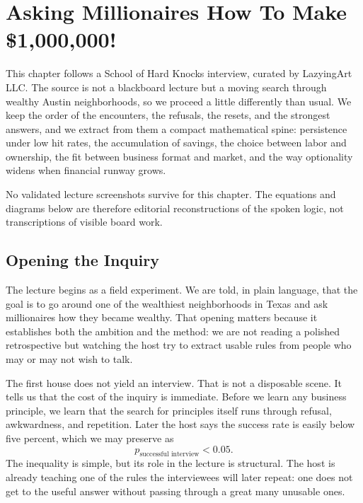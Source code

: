 \chapter{Asking Millionaires How To Make \$1{,}000{,}000!}

This chapter follows a School of Hard Knocks interview, curated by LazyingArt LLC. The source is not a blackboard lecture but a moving search through wealthy Austin neighborhoods, so we proceed a little differently than usual. We keep the order of the encounters, the refusals, the resets, and the strongest answers, and we extract from them a compact mathematical spine: persistence under low hit rates, the accumulation of savings, the choice between labor and ownership, the fit between business format and market, and the way optionality widens when financial runway grows.

\begin{remark}
No validated lecture screenshots survive for this chapter. The equations and diagrams below are therefore editorial reconstructions of the spoken logic, not transcriptions of visible board work.
\end{remark}

\section{Opening the Inquiry}

The lecture begins as a field experiment. We are told, in plain language, that the goal is to go around one of the wealthiest neighborhoods in Texas and ask millionaires how they became wealthy. That opening matters because it establishes both the ambition and the method: we are not reading a polished retrospective but watching the host try to extract usable rules from people who may or may not wish to talk.

The first house does not yield an interview. That is not a disposable scene. It tells us that the cost of the inquiry is immediate. Before we learn any business principle, we learn that the search for principles itself runs through refusal, awkwardness, and repetition. Later the host says the success rate is easily below five percent, which we may preserve as
\begin{equation}
p_{\text{successful interview}} < 0.05.
\end{equation}
The inequality is simple, but its role in the lecture is structural. The host is already teaching one of the rules the interviewees will later repeat: one does not get to the useful answer without passing through a great many unusable ones.

